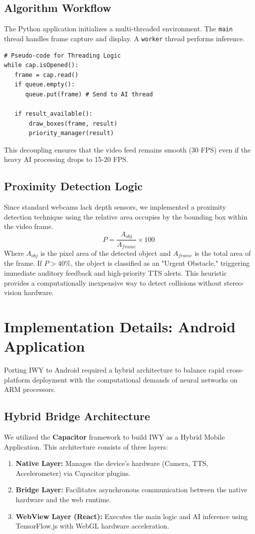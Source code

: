 \documentclass[11pt, a4paper, twocolumn]{article}
\begin{document}
\subsection{Algorithm Workflow}
The Python application initializes a multi-threaded environment. The \texttt{main} thread handles frame capture and display. A \texttt{worker} thread performs inference.
\begin{verbatim}
# Pseudo-code for Threading Logic
while cap.isOpened():
   frame = cap.read()
   if queue.empty():
      queue.put(frame) # Send to AI thread
   
   if result_available():
       draw_boxes(frame, result)
       priority_manager(result)
\end{verbatim}
This decoupling ensures that the video feed remains smooth (30 FPS) even if the heavy AI processing drops to 15-20 FPS.

\subsection{Proximity Detection Logic}
Since standard webcams lack depth sensors, we implemented a proximity detection technique using the relative area occupies by the bounding box within the video frame.
\begin{equation}
    P = \frac{A_{obj}}{A_{frame}} \times 100
\end{equation}
Where $A_{obj}$ is the pixel area of the detected object and $A_{frame}$ is the total area of the frame. If $P > 40\%$, the object is classified as an "Urgent Obstacle," triggering immediate auditory feedback and high-priority TTS alerts. This heuristic provides a computationally inexpensive way to detect collisions without stereo-vision hardware.

\section{Implementation Details: Android Application}
Porting IWY to Android required a hybrid architecture to balance rapid cross-platform deployment with the computational demands of neural networks on ARM processors.

\subsection{Hybrid Bridge Architecture}
We utilized the \textbf{Capacitor} framework \cite{capacitor} to build IWY as a Hybrid Mobile Application. This architecture consists of three layers:
\begin{enumerate}
    \item \textbf{Native Layer:} Manages the device's hardware (Camera, TTS, Accelerometer) via Capacitor plugins.
    \item \textbf{Bridge Layer:} Facilitates asynchronous communication between the native hardware and the web runtime.
    \item \textbf{WebView Layer (React):} Executes the main logic and AI inference using TensorFlow.js with WebGL hardware acceleration.
\end{enumerate}
\end{document}
